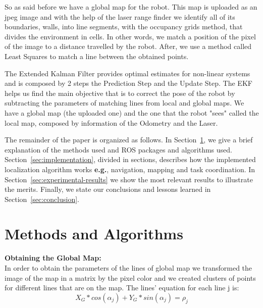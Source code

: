 \documentclass[a4paper]{IEEEtran}
\begin{document}
So as said before we have a global map for the robot. This map is uploaded as an jpeg image and with the help of the laser range finder we identify all of its boundaries, walls, into line segments, with the
occupancy grids method, that divides the environment in cells. In other words, we match a position of the pixel of the image to a distance travelled by the robot. After, we use a method called Least Squares to match a line between the obtained points.\par
The Extended Kalman Filter provides optimal estimates for non-linear systems and is composed by 2 steps the Prediction Step and the Update Step. The EKF helps us find the main objective that is to correct the pose of the robot by subtracting the parameters of matching lines from local and global maps. We have a global map (the uploaded one) and the one that the robot "sees" called the local map, composed by information of the Odometry and the Laser.

The remainder of the paper is organized as follows. In
Section~\ref{sec:methods-algorithms}, we give a brief explanation of the methods used and ROS packages and algorithms used.
Section~\ref{sec:implementation}, divided in sections, describes how the implemented localization algorithm works \textbf{e.g.}, navigation, mapping and task coordination. In Section~\ref{sec:experimental-results} we show the most relevant results to illustrate the merits. Finally, we state our conclusions and lessons learned in Section~\ref{sec:conclusion}. 

\section{Methods and Algorithms}
\label{sec:methods-algorithms}
\textbf{Obtaining the Global Map:}\\
In order to obtain the parameters of the lines of global map we transformed the image of the map in a matrix by the pixel color and we created clusters of points for different lines that are on the map. The lines' equation for each line j is:
\begin{equation}
X_{G}*cos(\alpha_{j})+Y_{G}*sin(\alpha_{j})=\rho_{j}
\end{equation}
\end{document}
